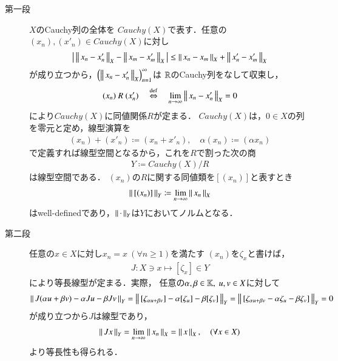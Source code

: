 	\begin{prf}\mbox{}
		\begin{description}
			\item[第一段]
				$X$のCauchy列の全体を
				$Cauchy(X)$で表す．任意の$(x_n),(x'_n) \in Cauchy(X)$に対し
				\begin{align}
					\left|\, \left\|\, x_n - x'_n\, \right\|_{X} - \left\|\, x_m - x'_m\, \right\|_{X}\, \right|
					\leq \left\|\, x_n - x_m\, \right\|_{X} + \left\|\, x'_n - x'_m\, \right\|_{X}
				\end{align}
				が成り立つから，$\left( \left\|\, x_n - x'_n\, \right\|_{X} \right)_{n=1}^\infty$は
				$\mathbb{R}$のCauchy列をなして収束し，
				\begin{align}
					(x_n)\ R\ (x'_n)
					\quad \overset{\mathrm{def}}{\Leftrightarrow} \quad \lim_{n \to \infty} \left\|\, x_n - x'_n\, \right\|_{X} = 0
				\end{align}
				により$Cauchy(X)$に同値関係$R$が定まる．
				$Cauchy(X)$は，$0 \in X$の列を零元と定め，線型演算を
				\begin{align}
					(x_n) + (x'_n) \coloneqq (x_n + x'_n),
					\quad \alpha (x_n) \coloneqq (\alpha x_n)
				\end{align}
				で定義すれば線型空間となるから，これを$R$で割った次の商
				\begin{align}
					Y \coloneqq Cauchy(X) / R
				\end{align}
				は線型空間である．
				$(x_n)$の$R$に関する同値類を$[(x_n)]$と表すとき
				\begin{align}
					\left\|\, [(x_n)]\, \right\|_{Y} \coloneqq \lim_{n \to \infty} \left\|\, x_n\, \right\|_{X}
					\label{eq:thm_expansion_of_normed_space_1}
				\end{align}
				はwell-definedであり，$\left\|\, \cdot\, \right\|_{Y}$は$Y$においてノルムとなる．
			
			\item[第二段]
				任意の$x \in X$に対し$x_n = x\ (\forall n \geq 1)$を満たす
				$(x_n)$を$\zeta_x$と書けば，
				\begin{align}
					J: X \ni x \longmapsto [\zeta_x] \in Y
					\label{eq:thm_expansion_of_normed_space_2}
				\end{align}
				により等長線型が定まる．実際，
				任意の$\alpha,\beta \in \mathbb{K},\ u,v \in X$に対して
				\begin{align}
					\left\|\, J (\alpha u + \beta v) - \alpha J u - \beta J v\, \right\|_{Y}
					= \left\|\, [\zeta_{\alpha u + \beta v}] - \alpha [\zeta_u] - \beta [\zeta_v]\, \right\|_{Y}
					= \left\|\, [\zeta_{\alpha u + \beta v} - \alpha \zeta_u - \beta \zeta_v]\, \right\|_{Y}
					= 0
				\end{align}
				が成り立つから$J$は線型であり，
				\begin{align}
					\left\|\, J x\, \right\|_{Y} = \lim_{n \to \infty} \left\|\, x_n\, \right\|_{X}
					= \left\|\, x\, \right\|_{X},
					\quad (\forall x \in X)
				\end{align}
				より等長性も得られる．
			

\end{description}
\end{prf}
